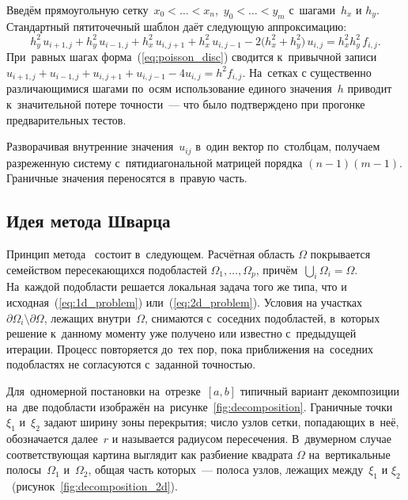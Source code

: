 Введём прямоугольную сетку~$x_0<\dots<x_n$,~$y_0<\dots<y_m$ с~шагами~$h_x$ и
$h_y$. Стандартный пятиточечный шаблон даёт следующую аппроксимацию:
\begin{equation}\label{eq:poisson_disc}
	h_y^2\,u_{i+1,j} + h_y^2\,u_{i-1,j}
	+ h_x^2\,u_{i,j+1} + h_x^2\,u_{i,j-1}
	- 2\bigl(h_x^2+h_y^2\bigr)\,u_{i,j}
	= h_x^2 h_y^2\,f_{i,j}.
\end{equation}
При~равных шагах форма~(\ref{eq:poisson_disc}) сводится к~привычной записи
$u_{i+1,j}+u_{i-1,j}+u_{i,j+1}+u_{i,j-1}-4u_{i,j}=h^2 f_{i,j}$. На~сетках с
существенно различающимися шагами по~осям использование единого значения~$h$
приводит к~значительной потере точности~--- что было подтверждено при
прогонке предварительных тестов.

Разворачивая внутренние значения~$u_{ij}$ в~один вектор по~столбцам,
получаем разреженную систему с~пятидиагональной матрицей порядка
$(n-1)(m-1)$. Граничные значения переносятся в~правую часть.

\subsection{Идея метода Шварца}

Принцип метода~\cite{schwarz1870} состоит в~следующем. Расчётная область
$\Omega$ покрывается семейством пересекающихся подобластей
$\Omega_1,\dots,\Omega_p$, причём~\mbox{$\bigcup_i \Omega_i = \Omega$}. На~каждой
подобласти решается локальная задача того же типа, что и
исходная~(\ref{eq:1d_problem}) или~(\ref{eq:2d_problem}). Условия на
участках~$\partial\Omega_i\setminus\partial\Omega$, лежащих внутри~$\Omega$,
снимаются с~соседних подобластей, в~которых решение к~данному моменту уже
получено или известно с~предыдущей итерации. Процесс повторяется до~тех пор,
пока приближения на~соседних подобластях не согласуются с~заданной точностью.

Для~одномерной постановки на~отрезке~$[a,b]$ типичный вариант декомпозиции
на~две подобласти изображён на~рисунке~\ref{fig:decomposition}. Граничные
точки~$\xi_1$ и~$\xi_2$ задают ширину зоны перекрытия; число узлов сетки,
попадающих в~неё, обозначается далее~$r$ и называется радиусом пересечения.
В~двумерном случае соответствующая картина выглядит как разбиение квадрата
$\Omega$ на~вертикальные полосы~$\Omega_1$ и~$\Omega_2$, общая часть
которых~--- полоса узлов, лежащих между~$\xi_1$ и
$\xi_2$~(рисунок~\ref{fig:decomposition_2d}).

